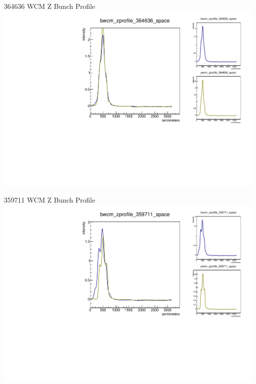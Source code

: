 \begin{frame}{364636 WCM Z Bunch Profile}
\includegraphics[width=\linewidth,height=\textheight,keepaspectratio]{../HourglassResults/figs/364636_wcm_zprofile.pdf}
\end{frame}

\begin{frame}{359711 WCM Z Bunch Profile}
\includegraphics[width=\linewidth,height=\textheight,keepaspectratio]{../HourglassResults/figs/359711_wcm_zprofile.pdf}
\end{frame}

